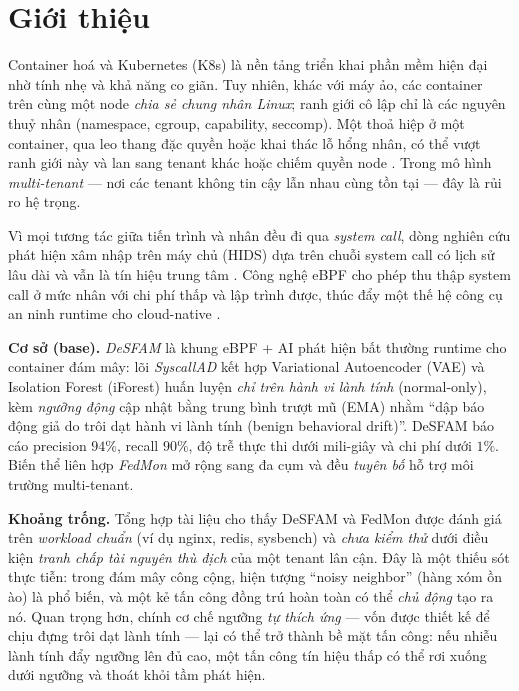 \documentclass[conference,10pt]{IEEEtran}
\begin{document}
\section{Giới thiệu}
Container hoá và Kubernetes (K8s) là nền tảng triển khai phần mềm hiện đại nhờ tính nhẹ và khả năng co giãn. Tuy nhiên, khác với máy ảo, các container trên cùng một node \textit{chia sẻ chung nhân Linux}; ranh giới cô lập chỉ là các nguyên thuỷ nhân (namespace, cgroup, capability, seccomp). Một thoả hiệp ở một container, qua leo thang đặc quyền hoặc khai thác lỗ hổng nhân, có thể vượt ranh giới này và lan sang tenant khác hoặc chiếm quyền node \cite{crosscontainer2023,ebpfguard2026}. Trong mô hình \textit{multi-tenant} — nơi các tenant không tin cậy lẫn nhau cùng tồn tại — đây là rủi ro hệ trọng.

Vì mọi tương tác giữa tiến trình và nhân đều đi qua \textit{system call}, dòng nghiên cứu phát hiện xâm nhập trên máy chủ (HIDS) dựa trên chuỗi system call có lịch sử lâu dài và vẫn là tín hiệu trung tâm \cite{forrest1996sense,creech2014semantic,liu2018hids,bridges2019hostdata}. Công nghệ eBPF cho phép thu thập system call ở mức nhân với chi phí thấp và lập trình được, thúc đẩy một thế hệ công cụ an ninh runtime cho cloud-native \cite{syairozi2025ebpfcompare,safebpf2024,hu2026eids}.

\textbf{Cơ sở (base).} \textit{DeSFAM} \cite{desfam_original} là khung eBPF + AI phát hiện bất thường runtime cho container đám mây: lõi \textit{SyscallAD} kết hợp Variational Autoencoder (VAE) và Isolation Forest (iForest) huấn luyện \textit{chỉ trên hành vi lành tính} (normal-only), kèm \textit{ngưỡng động} cập nhật bằng trung bình trượt mũ (EMA) nhằm ``dập báo động giả do trôi dạt hành vi lành tính (benign behavioral drift)''. DeSFAM báo cáo precision $94\%$, recall $90\%$, độ trễ thực thi dưới mili-giây và chi phí dưới $1\%$. Biến thể liên hợp \textit{FedMon} \cite{fedmon2025} mở rộng sang đa cụm và đều \textit{tuyên bố} hỗ trợ môi trường multi-tenant.

\textbf{Khoảng trống.} Tổng hợp tài liệu cho thấy DeSFAM và FedMon được đánh giá trên \textit{workload chuẩn} (ví dụ nginx, redis, sysbench) và \textit{chưa kiểm thử} dưới điều kiện \textit{tranh chấp tài nguyên thù địch} của một tenant lân cận. Đây là một thiếu sót thực tiễn: trong đám mây công cộng, hiện tượng ``noisy neighbor'' (hàng xóm ồn ào) là phổ biến, và một kẻ tấn công đồng trú hoàn toàn có thể \textit{chủ động} tạo ra nó. Quan trọng hơn, chính cơ chế ngưỡng \textit{tự thích ứng} — vốn được thiết kế để chịu đựng trôi dạt lành tính — lại có thể trở thành bề mặt tấn công: nếu nhiễu lành tính đẩy ngưỡng lên đủ cao, một tấn công tín hiệu thấp có thể rơi xuống dưới ngưỡng và thoát khỏi tầm phát hiện.
\end{document}
